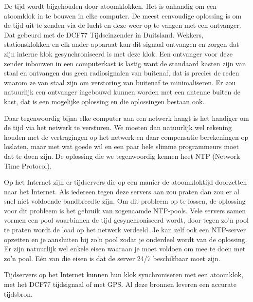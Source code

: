 De tijd wordt bijgehouden door atoomklokken. Het is onhandig om een atoomklok in te bouwen in elke computer. De meest eenvoudige oplossing is om de tijd uit te zenden via de lucht en deze weer op te vangen met een ontvanger. Dat gebeurd met de DCF77 Tijdseinzender in Duitsland. Wekkers, stationsklokken en elk ander apparaat kan dit signaal ontvangen en zorgen dat zijn interne klok gesynchroniseerd is met deze klok. Een ontvanger voor deze zender inbouwen in een computerkast is lastig want de standaard kasten zijn van staal en ontvangen dus geen radiosignalen van buitenaf, dat is precies de reden waarom ze van staal zijn om verstoring van buitenaf te minimaliseren. Er zou natuurlijk een ontvanger ingebouwd kunnen worden met een antenne buiten de kast, dat is een mogelijke oplossing en die oplossingen bestaan ook.

Daar tegenwoordig bijna elke computer aan een netwerk hangt is het handiger om de tijd via het netwerk te versturen. We moeten dan natuurlijk wel rekening houden met de vertragingen op het netwerk en daar compensatie berekeningen op loslaten, maar met wat goede wil en een paar hele slimme programmeurs moet dat te doen zijn. De oplossing die we tegenwoordig kennen heet NTP (Network Time Protocol).

Op het Internet zijn er tijdservers die op een manier de atoomkloktijd doorzetten naar het Internet. Als iedereen tegen deze servers aan zou praten dan zou er al snel niet voldoende bandbreedte zijn. Om dit probleem op te lossen, de oplossing voor dit probleem is het gebruik van zogenaamde NTP-pools. Vele servers samen vormen een pool waarbinnen de tijd gesynchroniseerd wordt, door tegen zo'n pool te praten wordt de load op het netwerk verdeeld. Je kan zelf ook een NTP-server opzetten en je aansluiten bij zo'n pool zodat je onderdeel wordt van de oplossing. Er zijn natuurlijk wel enkele eisen waaraan je moet voldoen om mee te doen met zo'n pool. E\'en van die eisen is dat de server 24/7 beschikbaar moet zijn.

Tijdservers op het Internet kunnen hun klok synchroniseren met een atoomklok, met het DCF77 tijdsignaal of met GPS. Al deze bronnen leveren een accurate tijdsbron.

